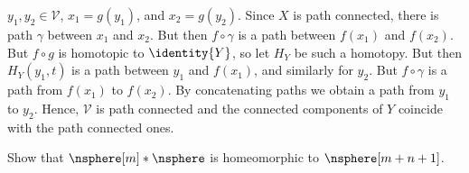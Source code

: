 \documentclass{article}                                                        %
\begin{document}
\begin{solution}
        $y_{1},y_{2}\in\mathcal{V}$, $x_{1}=g(y_{1})$, and $x_{2}=g(y_{2})$.
        Since $X$ is path connected, there is path $\gamma$ between $x_{1}$ and
        $x_{2}$. But then $f\circ\gamma$ is a path between $f(x_{1})$ and
        $f(x_{2})$. But $f\circ{g}$ is homotopic to $\identity{Y}$, so let
        $H_{Y}$ be such a homotopy. But then $H_{Y}(y_{1},t)$ is a path between
        $y_{1}$ and $f(x_{1})$, and similarly for $y_{2}$. But $f\circ\gamma$
        is a path from $f(x_{1})$ to $f(x_{2})$. By concatenating paths we
        obtain a path from $y_{1}$ to $y_{2}$. Hence, $\mathcal{V}$ is path
        connected and the connected components of $Y$ coincide with the path
        connected ones.
    \end{solution}
    \begin{problem}
        Show that $\nsphere[m]*\nsphere$ is homeomorphic to $\nsphere[m+n+1]$.
    \end{problem}
\end{document}
